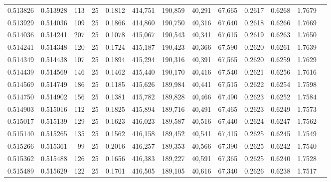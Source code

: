 \begin{tabular}{rrrrrrrrrrrrr}
0.513826 & 0.513928 &   113 &  25 &                                     0.1812 & 414,751 & 190,859 &  40,291 &  67,665 & 0.2617 & 0.6268 & 1.7679 \\
0.513929 & 0.514036 &   109 &  25 &                                     0.1866 & 414,860 & 190,750 &  40,316 &  67,640 & 0.2618 & 0.6266 & 1.7669 \\
0.514036 & 0.514241 &   207 &  25 &                                     0.1078 & 415,067 & 190,543 &  40,341 &  67,615 & 0.2619 & 0.6263 & 1.7650 \\
0.514241 & 0.514348 &   120 &  25 &                                     0.1724 & 415,187 & 190,423 &  40,366 &  67,590 & 0.2620 & 0.6261 & 1.7639 \\
0.514349 & 0.514438 &   107 &  25 &                                     0.1894 & 415,294 & 190,316 &  40,391 &  67,565 & 0.2620 & 0.6259 & 1.7629 \\
0.514439 & 0.514569 &   146 &  25 &                                     0.1462 & 415,440 & 190,170 &  40,416 &  67,540 & 0.2621 & 0.6256 & 1.7616 \\
0.514569 & 0.514749 &   186 &  25 &                                     0.1185 & 415,626 & 189,984 &  40,441 &  67,515 & 0.2622 & 0.6254 & 1.7598 \\
0.514750 & 0.514902 &   156 &  25 &                                     0.1381 & 415,782 & 189,828 &  40,466 &  67,490 & 0.2623 & 0.6252 & 1.7584 \\
0.514903 & 0.515016 &   112 &  25 &                                     0.1825 & 415,894 & 189,716 &  40,491 &  67,465 & 0.2623 & 0.6249 & 1.7573 \\
0.515017 & 0.515139 &   129 &  25 &                                     0.1623 & 416,023 & 189,587 &  40,516 &  67,440 & 0.2624 & 0.6247 & 1.7562 \\
0.515140 & 0.515265 &   135 &  25 &                                     0.1562 & 416,158 & 189,452 &  40,541 &  67,415 & 0.2625 & 0.6245 & 1.7549 \\
0.515266 & 0.515361 &    99 &  25 &                                     0.2016 & 416,257 & 189,353 &  40,566 &  67,390 & 0.2625 & 0.6242 & 1.7540 \\
0.515362 & 0.515488 &   126 &  25 &                                     0.1656 & 416,383 & 189,227 &  40,591 &  67,365 & 0.2625 & 0.6240 & 1.7528 \\
0.515489 & 0.515629 &   122 &  25 &                                     0.1701 & 416,505 & 189,105 &  40,616 &  67,340 & 0.2626 & 0.6238 & 1.7517 \\

\end{tabular}
